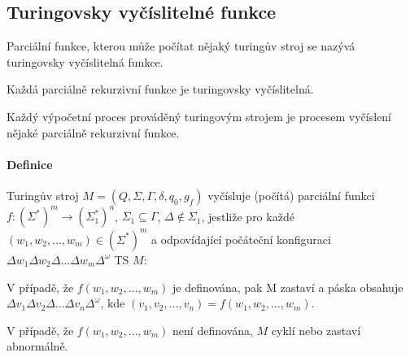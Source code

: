 \subsection{Turingovsky vyčíslitelné funkce}

\begin{compactitem}
    \item Parciální funkce, kterou může počítat nějaký turingův stroj se nazývá turingovsky vyčíslitelná funkce.

    \item Každá parciálně rekurzivní funkce je turingovsky vyčíslitelná.

    \item Každý výpočetní proces prováděný turingovým strojem je procesem vyčíslení nějaké parciálně rekurzivní funkce.
\end{compactitem}

\paragraph*{Definice} Turingův stroj $M = (Q, \Sigma, \Gamma, \delta, q_0, g_f)$ vyčísluje (počítá) parciální funkci $f : (\Sigma^{*})^m \rightarrow (\Sigma_1^{*})^n$, $\Sigma_1 \subseteq \Gamma$, $\Delta \not\in \Sigma_1$, jestliže pro každé $(w_1, w_2, \ldots, w_m) \in (\Sigma^{*})^m$ a odpovídající počáteční konfiguraci $\Delta w_1 \Delta w_2 \Delta \ldots \Delta w_m \Delta^{\omega}$ TS $M$: \begin{compactenum}
    \item V případě, že $f(w_1, w_2, \ldots, w_m)$ je definována, pak M zastaví a páska obsahuje $\Delta v_1 \Delta v_2 \Delta \ldots \Delta v_n \Delta^{\omega}$, kde $(v_1, v_2, \ldots, v_n) = f(w_1, w_2, \ldots, w_m)$.
    \item V případě, že $f(w_1, w_2, \ldots, w_m)$ není definována, $M$ cyklí nebo zastaví abnormálně.
\end{compactenum}
